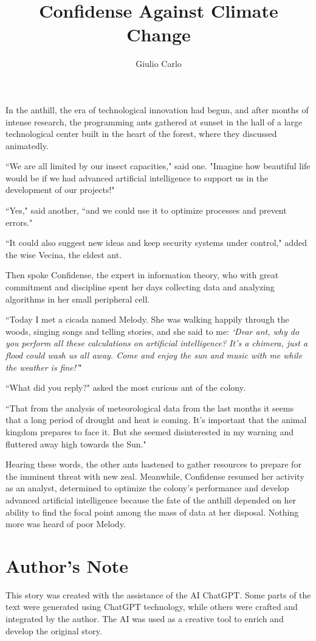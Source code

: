\documentclass[12pt,b5paper]{article}
\author{Giulio Carlo}
\date{}
\title{Confidense Against Climate Change}
\begin{document}
\maketitle

In the anthill, the era of technological innovation had begun, and after months
of intense research, the programming ants gathered at sunset in the hall of a
large technological center built in the heart of the forest, where they
discussed animatedly.

``We are all limited by our insect capacities," said one. "Imagine how beautiful
life would be if we had advanced artificial intelligence to support us in the
development of our projects!"

``Yes," said another, ``and we could use it to optimize processes and prevent
errors."

``It could also suggest new ideas and keep security systems under control,"
added the wise Vecina, the eldest ant.

Then spoke Confidense, the expert in information theory, who with great commitment
and discipline spent her days collecting data and analyzing algorithms in her
small peripheral cell.

``Today I met a cicada named Melody. She was walking happily through the woods,
singing songs and telling stories, and she said to me: \emph{`Dear ant, why do
you perform all these calculations on artificial intelligence? It's a chimera,
just a flood could wash us all away. Come and enjoy the sun and music
with me while the weather is fine!'}"

``What did you reply?" asked the most curious ant of the colony.

``That from the analysis of meteorological data from the last months it seems
that a long period of drought and heat is coming. It's important that the
animal kingdom prepares to face it. But she seemed disinterested in my warning
and fluttered away high towards the Sun."

Hearing these words, the other ants hastened to gather resources to prepare
for the imminent threat with new zeal. Meanwhile, Confidense resumed her activity
as an analyst, determined to optimize the colony's performance and develop
advanced artificial intelligence because the fate of the anthill depended on
her ability to find the focal point among the mass of data at her disposal.
Nothing more was heard of poor Melody.

\newpage
\section*{Author's Note}
This story was created with the assistance of the AI ChatGPT. Some parts of the
text were generated using ChatGPT technology, while others were crafted and
integrated by the author. The AI was used as a creative tool to enrich and
develop the original story.
\end{document}
